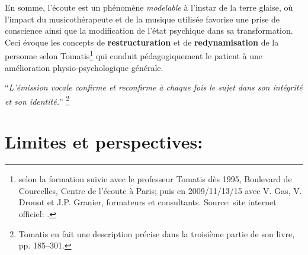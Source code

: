 

        

  

En somme, l'écoute est un phénomène \textit{modelable} à l'instar de
la terre glaise, où l'impact du musicothérapeute et de la musique utilisée favorise une prise de
conscience ainsi que la modification
de  l'état psychique dans sa transformation.
Ceci évoque les concepts de \textbf{restructuration }et de
\textbf{redynamisation} de la personne selon Tomatis\footnote{selon la formation
   suivie avec le professeur Tomatis dès 1995, Boulevard de Courcelles, Centre de l'écoute à Paris; puis en 2009/11/13/15 avec V. Gas, V. Drouot et
J.P. Granier, formateurs et consultants. Source: site internet
officiel: \cite{tomatis.com}.}
qui conduit pédagogiquement le patient à une amélioration physio-psychologique
générale.

\enquote{\emph{L'émission vocale confirme et reconfirme à chaque
fois le sujet dans son intégrité et son identité.}}%
\autocite{tomatis:loreille}\footnote{Tomatis en fait une description précise dans la troisième partie de
son livre, pp. 185--301.}










  \section{Limites et perspectives: }

